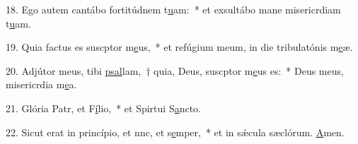18. Ego autem cantábo fortitúdnem t\uline{u}am:~* et exsultábo mane misericrdiam t\uline{u}am.\par 
19. Quia factus es suscptor m\uline{e}us,~* et refúgium meum, in die tribulatónis m\uline{e}æ.\par 
20. Adjútor meus, tibi \uline{psal}lam,~† quia, Deus, suscptor m\uline{e}us es:~* Deus meus, misericrdia m\uline{e}a.\par 
21. Glória Patr, et F\uline{í}lio,~* et Spirtui S\uline{a}ncto.\par 
22. Sicut erat in princípio, et nnc, et s\uline{e}mper,~* et in sǽcula sæclórum. \uline{A}men.\par 
